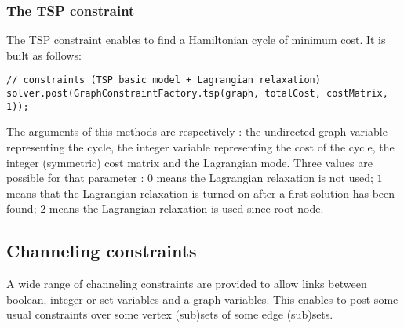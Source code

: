 \documentclass{article}
\begin{document}
\subsubsection{The TSP constraint}

The TSP constraint enables to find a Hamiltonian cycle of minimum cost. It is built as follows:
\begin{lstlisting}
// constraints (TSP basic model + Lagrangian relaxation)
solver.post(GraphConstraintFactory.tsp(graph, totalCost, costMatrix, 1));
\end{lstlisting}

The arguments of this methods are respectively : the undirected graph variable representing the cycle, the integer variable representing the cost of the cycle, the integer (symmetric) cost matrix and the Lagrangian mode. Three values are possible for that parameter : $0$ means the Lagrangian relaxation is not used; $1$ means that the Lagrangian relaxation is turned on after a first solution has been found; $2$ means the Lagrangian relaxation is used since root node.

%
%

\subsection{Channeling constraints}

A wide range of channeling constraints are provided to allow links between boolean, integer or set variables and a graph variables. 
This enables to post some usual constraints over some vertex (sub)sets of some edge (sub)sets. 
\end{document}
